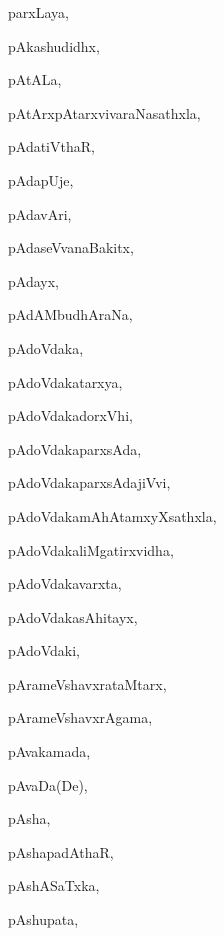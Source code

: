 \begin{multicols}{3}
{\noindent
{parxLaya}, \pageref{parxLaya}

\noindent
{pAkashudidhx}, \pageref{pAkashudidhx}

\noindent
{pAtALa}, \pageref{pAtALa}

\noindent
{pAtArxpAtarxvivaraNasathxla}, \pageref{pAtArxpAtarxvivaraNasathxla}

\noindent
{pAdatiVthaR}, \pageref{pAdatiVthaR}

\noindent
{pAdapUje}, \pageref{pAdapUje}

\noindent
{pAdavAri}, \pageref{pAdavAri}

\noindent
{pAdaseVvanaBakitx}, \pageref{pAdaseVvanaBakitx}

\noindent
{pAdayx}, \pageref{pAdayx}

\noindent
{pAdAMbudhAraNa}, \pageref{pAdAMbudhAraNa}

\noindent
{pAdoVdaka}, \pageref{pAdoVdaka}

\noindent
{pAdoVdakatarxya}, \pageref{pAdoVdakatarxya}

\noindent
{pAdoVdakadorxVhi}, \pageref{pAdoVdakadorxVhi}

\noindent
{pAdoVdakaparxsAda}, \pageref{pAdoVdakaparxsAda}

\noindent
{pAdoVdakaparxsAdajiVvi}, \pageref{pAdoVdakaparxsAdajiVvi}

\noindent
{pAdoVdakamAhAtamxyXsathxla}, \pageref{pAdoVdakamAhAtamxyXsathxla}

\noindent
{pAdoVdakaliMgatirxvidha}, \pageref{pAdoVdakaliMgatirxvidha}

\noindent
{pAdoVdakavarxta}, \pageref{pAdoVdakavarxta}

\noindent
{pAdoVdakasAhitayx}, \pageref{pAdoVdakasAhitayx}

\noindent
{pAdoVdaki}, \pageref{pAdoVdaki}

\noindent
{pArameVshavxrataMtarx}, \pageref{pArameVshavxrataMtarx}

\noindent
{pArameVshavxrAgama}, \pageref{pArameVshavxrAgama}

\noindent
{pAvakamada}, \pageref{pAvakamada}

\noindent
{pAvaDa(De)}, \pageref{pAvaDaDe}

\noindent
{pAsha}, \pageref{pAsha}

\noindent
{pAshapadAthaR}, \pageref{pAshapadAthaR}

\noindent
{pAshASaTxka}, \pageref{pAshASaTxka}

\noindent
{pAshupata}, \pageref{pAshupata}

}
\end{multicols}
